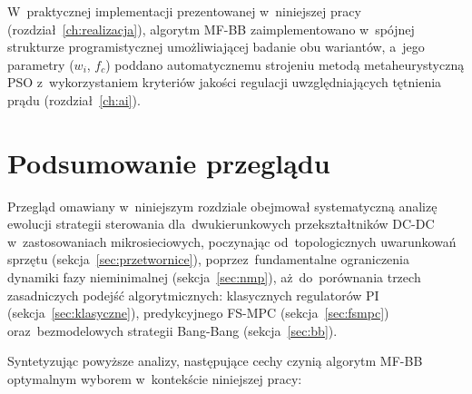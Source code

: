 W~praktycznej implementacji prezentowanej w~niniejszej pracy (rozdział~\ref{ch:realizacja}), algorytm MF-BB zaimplementowano w~spójnej strukturze programistycznej umożliwiającej badanie obu wariantów, a~jego parametry ($w_i$, $f_c$) poddano automatycznemu strojeniu metodą metaheurystyczną PSO z~wykorzystaniem kryteriów jakości regulacji uwzględniających tętnienia prądu (rozdział~\ref{ch:ai}).

\section{Podsumowanie przeglądu}
\label{sec:przeglad-podsumowanie}

Przegląd omawiany w~niniejszym rozdziale obejmował systematyczną analizę ewolucji strategii sterowania dla~dwukierunkowych przekształtników DC-DC w~zastosowaniach mikrosieciowych, poczynając od~topologicznych uwarunkowań sprzętu (sekcja~\ref{sec:przetwornice}), poprzez~fundamentalne ograniczenia dynamiki fazy nieminimalnej (sekcja~\ref{sec:nmp}), aż~do~porównania trzech zasadniczych podejść algorytmicznych: klasycznych regulatorów PI (sekcja~\ref{sec:klasyczne}), predykcyjnego FS-MPC (sekcja~\ref{sec:fsmpc}) oraz~bezmodelowych strategii Bang-Bang (sekcja~\ref{sec:bb}).

Syntetyzując powyższe analizy, następujące cechy czynią algorytm MF-BB optymalnym wyborem w~kontekście niniejszej pracy:

